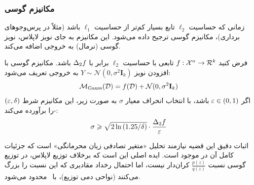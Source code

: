 
\subsubsection{مکانیزم گوسی}
\label{sec:mech:gaussian}

زمانی که حساسیت $\ell_2$ تابع بسیار کم‌تر از حساسیت $\ell_1$ باشد (مثلاً در پرس‌وجوهای برداری)، مکانیزم گوسی ترجیح داده می‌شود. این مکانیزم به جای نویز لاپلاس، نویز گوسی (نرمال) به خروجی اضافه می‌کند.

\begin{قضیه}
\label{thm:gaussian-privacy}
فرض کنید $f: \Xset^n \to \Rset^k$ تابعی با حساسیت $\ell_2$ برابر با $\Delta_2 f$ باشد. مکانیزم گوسی با افزودن نویز $Y \sim \mathcal{N}(0, \sigma^2 \mathbf{I}_k)$ به خروجی تعریف می‌شود:
\begin{equation}
\label{eq:gaussian-mech}
\mech_{\mathrm{Gauss}}(\Dset) = f(\Dset) + \mathcal{N}(0, \sigma^2 \mathbf{I}_k)
\end{equation}
اگر $\varepsilon \in (0, 1)$ باشد، با انتخاب انحراف معیار $\sigma$ به صورت زیر، این مکانیزم شرط $(\varepsilon, \delta)$-\DP را برآورده می‌کند:
\begin{equation}
\sigma \geqslant \sqrt{2 \ln\left(1.25/\delta\right)} \cdot \frac{\Delta_2 f}{\varepsilon}
\end{equation}
\end{قضیه}

\begin{اثبات}
اثبات دقیق این قضیه نیازمند تحلیل «متغیر تصادفی زیان محرمانگی» است که جزئیات کامل آن در  موجود است. ایده اصلی این است که برخلاف توزیع لاپلاس، در توزیع گوسی نسبت $\frac{p(z)}{q(z)}$ کران‌دار نیست، اما احتمال رخداد مقادیری که این نسبت را بزرگ می‌کنند (نواحی دمی توزیع)، با \del\ محدود می‌شود.
\end{اثبات}

